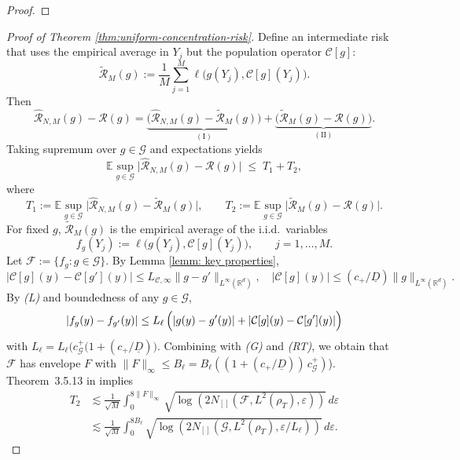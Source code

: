 \documentclass[11pt]{article}
\theoremstyle{remark}
\numberwithin{equation}{section}
\def\cmax{c_{+}}
\def\cGmax{c_{\mathcal{G}}^{+}}
\begin{document}
\begin{proof}
\end{proof}


\begin{proof}[Proof of Theorem \ref{thm:uniform-concentration-risk}]
Define an intermediate risk that uses the empirical average in $Y_j$ but
the population operator $\mathcal{C}[g]$:
\[
  \widetilde{\mathcal{R}}_M(g)
  :=
  \frac{1}{M}\sum_{j=1}^M
  \ell\bigl(g(Y_j),\mathcal{C}[g](Y_j)\bigr).
\]
Then
\[
  \widehat{\mathcal{R}}_{N,M}(g) - \mathcal{R}(g)
  =
  \underbrace{
    \bigl(\widehat{\mathcal{R}}_{N,M}(g) - \widetilde{\mathcal{R}}_M(g)\bigr)
  }_{(\mathrm{I})}
  +
  \underbrace{
    \bigl(\widetilde{\mathcal{R}}_M(g) - \mathcal{R}(g)\bigr)
  }_{(\mathrm{II})}.
\]
Taking supremum over $g\in\mathcal{G}$ and expectations yields
\[
  \mathbb{E}
  \sup_{g\in\mathcal{G}}
    \bigl|
      \widehat{\mathcal{R}}_{N,M}(g) - \mathcal{R}(g)
    \bigr|
  \;\le\;
  T_1 + T_2,
\]
where
\[
  T_1 := 
  \mathbb{E}
  \sup_{g\in\mathcal{G}}
    \bigl|
      \widehat{\mathcal{R}}_{N,M}(g) - \widetilde{\mathcal{R}}_M(g)
    \bigr|,
  \qquad
  T_2 :=
  \mathbb{E}
  \sup_{g\in\mathcal{G}}
    \bigl|
      \widetilde{\mathcal{R}}_M(g) - \mathcal{R}(g)
    \bigr|.
\]
For fixed $g$, $\widetilde{\mathcal{R}}_M(g)$ is the empirical average of the
i.i.d.\ variables
\[
  f_g(Y_j)
  :=
  \ell\bigl(g(Y_j),\mathcal{C}[g](Y_j)\bigr),
  \qquad j=1,\dots,M.
\]
Let
\(
  \mathcal{F}
  :=
  \bigl\{ f_g : g\in\mathcal{G}\bigr\}.
\)
By Lemma \ref{lemm: key properties}, 
\[
  |\mathcal{C}[g](y) - \mathcal{C}[g'](y)|
  \le
  L_{\mathcal C, \infty} \|g-g'\|_{L^\infty(\mathbb{R}^d)},\quad |\mathcal{C}[g](y)|\leq (\cmax/\underline{D})\|g\|_{L^\infty(\mathbb{R}^d)}.
\]
By  \emph{(L)} and boundedness of any $g\in\mathcal{G}$,
\[
  |f_g(y) - f_{g'}(y)|
  \le
  L_\ell\,\Bigl(
    |g(y) - g'(y)| + |\mathcal{C}[g](y) - \mathcal{C}[g'](y)|
  \Bigr)
\]
with $L_\ell=L_\ell\bigl(\cGmax(1+(\cmax/\underline{D})\bigr).$
Combining with \emph{(G)} and \emph{(RT)}, we obtain that $\mathcal{F}$ has 
envelope $F$ with  $\|F\|_{\infty}\leq B_\ell=B_\ell((1+(\cmax/\underline{D}))\,\cGmax)$).
Theorem~3.5.13 in \cite{GineNickl2016} implies
\begin{align}
\nonumber
    T_2 & \lesssim \frac{1}{\sqrt{M}} \int_{0}^{8 \|F\|_{\infty}} \sqrt{\log(2 N_{[]}(\mathcal{F}, L^{2}(\rho_T), \varepsilon))} \, d\varepsilon \\
    \label{eq:bound-T2}
    &\lesssim \frac{1}{\sqrt{M}}\int_{0}^{8  B_\ell} \sqrt{\log(2 N_{[]}(\mathcal{G}, L^{2}(\rho_T), \varepsilon/L_\ell))} \, d\varepsilon.
\end{align}

\end{proof}
\end{document}
